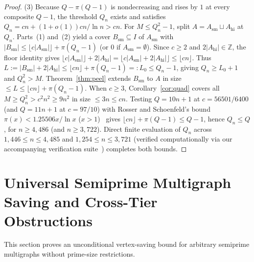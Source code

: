 \documentclass[11pt]{article}
\theoremstyle{remark}
\begin{document}
\begin{proof}
(3) Because $Q - \pi(Q - 1)$ is nondecreasing and rises by $1$ at every composite $Q - 1$, the threshold $Q_n$ exists and satisfies $Q_n = c n + (1 + o(1)) c n / \ln n > c n$. For $M \le Q_n^2 - 1$, split $A = A_{\mathrm{sm}} \sqcup A_{\mathrm{hi}}$ at $Q_n$. Parts~(1) and~(2) yield a cover $B_{\mathrm{sm}} \subseteq I$ of $A_{\mathrm{sm}}$ with $|B_{\mathrm{sm}}| \le \lfloor c |A_{\mathrm{sm}}| \rfloor + \pi(Q_n - 1)$ (or $0$ if $A_{\mathrm{sm}} = \emptyset$). Since $c \ge 2$ and $2 |A_{\mathrm{hi}}| \in \mathbb{Z}$, the floor identity gives $\lfloor c |A_{\mathrm{sm}}| \rfloor + 2 |A_{\mathrm{hi}}| = \lfloor c |A_{\mathrm{sm}}| + 2 |A_{\mathrm{hi}}| \rfloor \le \lfloor c n \rfloor$. Thus $L := |B_{\mathrm{sm}}| + 2 |A_{\mathrm{hi}}| \le \lfloor c n \rfloor + \pi(Q_n - 1) =: L_0 \le Q_n - 1$, giving $Q_n \ge L_0 + 1$ and $Q_n^2 > M$. Theorem~\ref{thm:peel} extends $B_{\mathrm{sm}}$ to $A$ in size $\le L \le \lfloor c n \rfloor + \pi(Q_n - 1)$. When $c \ge 3$, Corollary~\ref{cor:quad} covers all $M \ge Q_n^2 > c^2 n^2 \ge 9 n^2$ in size $\le 3 n \le c n$. Testing $Q = 10 n + 1$ at $c = 56501 / 6400$ (and $Q = 11 n + 1$ at $c = 97 / 10$) with Rosser and Schoenfeld's bound $\pi(x) < 1.25506 x / \ln x$ ($x > 1$)~\cite{rosserschoenfeld62} gives $\lfloor c n \rfloor + \pi(Q - 1) \le Q - 1$, hence $Q_n \le Q$, for $n \ge 4{,}486$ (and $n \ge 3{,}722$). Direct finite evaluation of $Q_n$ across $1{,}446 \le n \le 4{,}485$ and $1{,}254 \le n \le 3{,}721$ (verified computationally via our accompanying verification suite~\cite{bergstrom26code}) completes both bounds.
\end{proof}

\section{Universal Semiprime Multigraph Saving and Cross-Tier Obstructions}

This section proves an unconditional vertex-saving bound for arbitrary semiprime multigraphs without prime-size restrictions.
\end{document}
